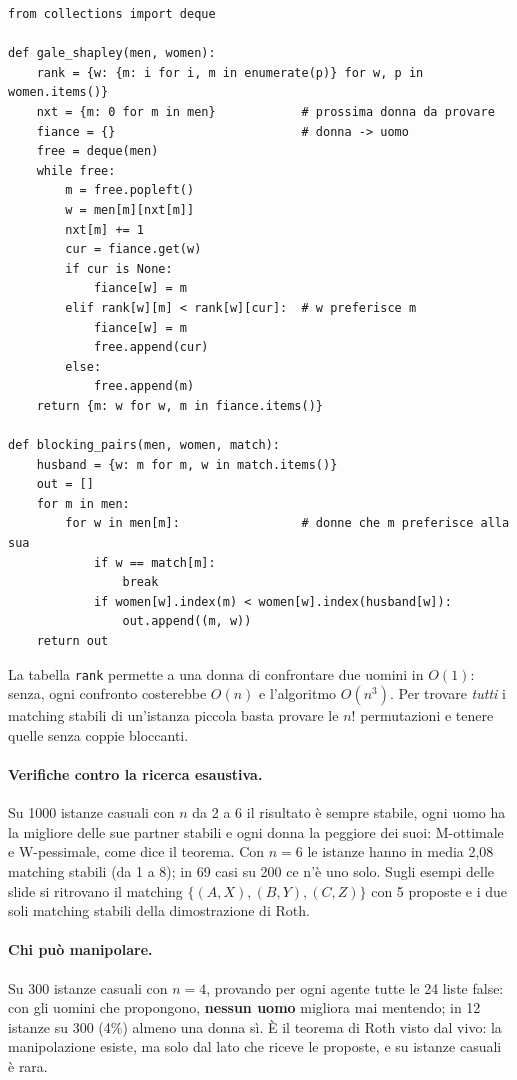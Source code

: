 \begin{lstlisting}
from collections import deque

def gale_shapley(men, women):
    rank = {w: {m: i for i, m in enumerate(p)} for w, p in women.items()}
    nxt = {m: 0 for m in men}            # prossima donna da provare
    fiance = {}                          # donna -> uomo
    free = deque(men)
    while free:
        m = free.popleft()
        w = men[m][nxt[m]]
        nxt[m] += 1
        cur = fiance.get(w)
        if cur is None:
            fiance[w] = m
        elif rank[w][m] < rank[w][cur]:  # w preferisce m
            fiance[w] = m
            free.append(cur)
        else:
            free.append(m)
    return {m: w for w, m in fiance.items()}

def blocking_pairs(men, women, match):
    husband = {w: m for m, w in match.items()}
    out = []
    for m in men:
        for w in men[m]:                 # donne che m preferisce alla sua
            if w == match[m]:
                break
            if women[w].index(m) < women[w].index(husband[w]):
                out.append((m, w))
    return out
\end{lstlisting}
La tabella \texttt{rank} permette a una donna di confrontare due uomini in $O(1)$: senza,
ogni confronto costerebbe $O(n)$ e l'algoritmo $O(n^3)$. Per trovare \emph{tutti} i
matching stabili di un'istanza piccola basta provare le $n!$ permutazioni e tenere quelle
senza coppie bloccanti.

\paragraph{Verifiche contro la ricerca esaustiva.} Su 1000 istanze casuali con $n$ da 2 a
6 il risultato è sempre stabile, ogni uomo ha la migliore delle sue partner stabili e ogni
donna la peggiore dei suoi: M-ottimale e W-pessimale, come dice il teorema. Con $n = 6$ le
istanze hanno in media 2,08 matching stabili (da 1 a 8); in 69 casi su 200 ce n'è uno
solo. Sugli esempi delle slide si ritrovano il matching $\{(A,X),(B,Y),(C,Z)\}$ con 5
proposte e i due soli matching stabili della dimostrazione di Roth.

\paragraph{Chi può manipolare.} Su 300 istanze casuali con $n = 4$, provando per ogni
agente tutte le 24 liste false: con gli uomini che propongono, \textbf{nessun uomo}
migliora mai mentendo; in 12 istanze su 300 (4\%) almeno una donna sì. È il teorema di
Roth visto dal vivo: la manipolazione esiste, ma solo dal lato che riceve le proposte, e
su istanze casuali è rara.

